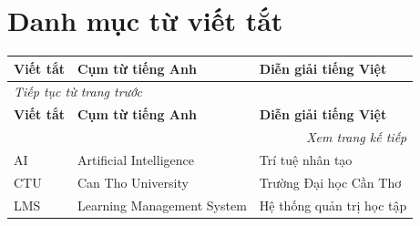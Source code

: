 
\chapter*{Danh mục từ viết tắt}

{\renewcommand{\baselinestretch}{1.0}\fontsize{12bp}{14bp}\selectfont
\begin{longtable}{lp{}p{}}
\toprule
\textbf{Viết tắt} & \textbf{Cụm từ tiếng Anh} & \textbf{Diễn giải tiếng Việt} \\ \midrule
\endfirsthead

\multicolumn{3}{l}{\textit{Tiếp tục từ trang trước}} \\ \toprule
\textbf{Viết tắt} & \textbf{Cụm từ tiếng Anh} & \textbf{Diễn giải tiếng Việt} \\ \midrule
\endhead

\midrule
\multicolumn{3}{r}{\textit{Xem trang kế tiếp}} \\
\endfoot

\bottomrule
\endlastfoot

AI  & Artificial Intelligence       & Trí tuệ nhân tạo \\
CTU & Can Tho University            & Trường Đại học Cần Thơ \\
LMS & Learning Management System    & Hệ thống quản trị học tập \\

\end{longtable}
}
